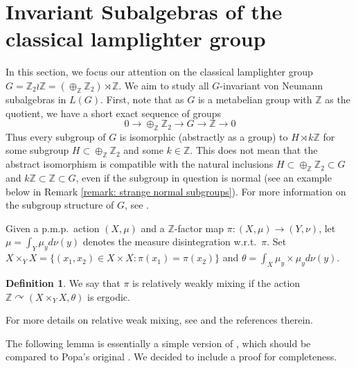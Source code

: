 \documentclass[11pt]{amsart}
\newcommand{\Z}{\mathbb Z}
\theoremstyle{plain}
\theoremstyle{definition}
\newtheorem{definition}[theorem]{Definition}
\theoremstyle{remark}
\numberwithin{equation}{section}
\begin{document}
\section{Invariant Subalgebras of the classical lamplighter group}
\label{Section: Lamplighter}
In this section, we focus our attention on the classical lamplighter group $G=\mathbb{Z}_2\wr\mathbb{Z}=(\oplus_{\mathbb{Z}}\Z_2)\rtimes \mathbb{Z}$. We aim to study all $G$-invariant von Neumann subalgebras in $L(G)$. First, note that as $G$ is a metabelian group with $\mathbb{Z}$ as the quotient, we have a short exact sequence of groups
$$0\rightarrow \oplus_{\mathbb{Z}}\Z_2\rightarrow G\rightarrow \mathbb{Z}\rightarrow 0$$
Thus every subgroup of $G$ is isomorphic (abstractly as a group) to  $H\rtimes k\mathbb{Z}$ for some subgroup $H\subset \oplus_{\mathbb{Z}}\Z_2$ and some $k\in\mathbb{Z}$.  This does not mean that the abstract isomorphism is compatible with the natural inclusions $H\subset \oplus_{\mathbb{Z}}\Z_2\subset G$ and  $k\mathbb{Z}\subset \Z \subset G$, even if the subgroup in question is normal (see an example below in Remark \ref{remark: strange normal subgroups}).
For more information on the subgroup structure of $G$, see \cite{GriKra}. 

Given a p.m.p.\ action $(X,\mu)$ and a $\mathbb{Z}$-factor map $\pi: (X,\mu)\rightarrow (Y,\nu)$, 
let $\mu=\int_Y\mu_yd\nu(y)$ denotes the measure disintegration w.r.t.\ $\pi$. Set $X\times_YX=\{(x_1,x_2)\in X\times X: \pi(x_1)=\pi(x_2)\}$ and $\theta=\int_{X}\mu_y\times\mu_yd\nu(y)$. 
\begin{definition}\label{def: relatively weakly mixint}
    We say that $\pi$ is relatively weakly mixing if the action $\mathbb{Z}\curvearrowright(X\times_YX,\theta)$ is ergodic. 
\end{definition}\noindent 
For more details on relative weak mixing, see \cite[\S~2.5]{Furman_IMRN} and the references therein.



The following lemma is essentially a simple version of \cite[Lemma 3.2]{Furman_IMRN}, which should be compared to Popa’s original \cite[Lemma 2.11]{Popa_cocycle}. We decided to include a proof for completeness. 
\end{document}
